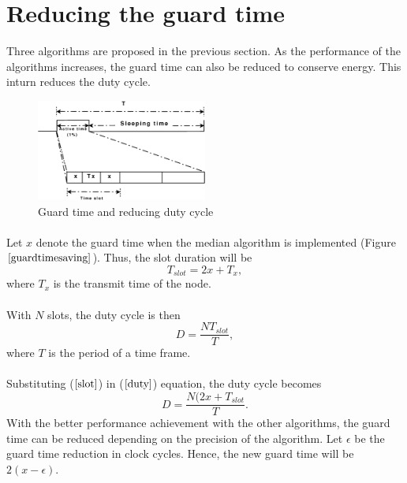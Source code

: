 \documentclass[a4paper,10pt]{report}
\begin{document}
\section{\textbf{Reducing the guard time}}
Three algorithms are proposed in the previous section. As the
performance of the algorithms increases, the guard time can also be
reduced to conserve energy. This inturn reduces the duty cycle.
\begin{figure}[b]
\centering
\includegraphics[width=0.5\textwidth]{guardtimesaving}
\caption{Guard time and reducing duty cycle} \label{guardtimesaving}
\end{figure}
\paragraph*{}
Let $x$ denote the guard time when the median algorithm is implemented (Figure $\ref{guardtimesaving}$). Thus, the slot
duration will be
\begin{equation}
T_{slot}=2x + T_x ,
\label{slot}
\end{equation}
where $T_x$ is the transmit time of the node.
\paragraph*{}
With $N$ slots, the duty cycle is then
\begin{equation}
D = \dfrac{NT_{slot}}{T}, \label{duty}
\end{equation}
where $T$ is the period of a time frame. \paragraph*{} Substituting ($\ref{slot}$) in ($\ref{duty}$) equation, the duty cycle becomes
\begin{equation}
D= \dfrac{N(2x+T_{slot}}{T}.
\end{equation}
With the better performance achievement with the other algorithms,
the guard time can be reduced depending on the precision of the
algorithm. Let $\epsilon$ be the guard time reduction in clock
cycles. Hence, the new guard time will be $2(x-\epsilon)$.
\end{document}
